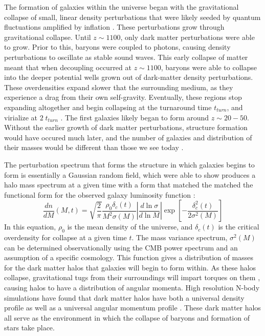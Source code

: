 The formation of galaxies within the universe began with the gravitational
collapse of small, linear density perturbations that were likely seeded by
quantum fluctuations amplified by inflation \citep{Guth1981,Linde1982}.  These
perturbations grow through gravitational collapse.  Until $z\sim1100$, only dark
matter perturbations were able to grow.  Prior to this, baryons were coupled to
photons, causing density perturbations to oscillate as stable sound waves.  This
early collapse of matter meant that when decoupling occurred at $z\sim1100$,
baryons were able to collapse into the deeper potential wells grown out of
dark-matter density perturbations.  These overdensities expand slower that the
surrounding medium, as they experience a drag from their own self-gravity.
Eventually, these regions stop expanding altogether and begin collapsing at the
turnaround time $t_{turn}$, and virialize at $2\;t_{turn}$ \citep{Peebles1980}.
The first galaxies likely began to form around $z\sim20-50$.  Without the
earlier growth of dark matter perturbations, structure formation would have
occured much later, and the number of galaxies and distribution of their masses
would be different than those we see today \citep{Davis1985}.

The perturbation spectrum that forms the structure in which galaxies begins to
form is essentially a Gaussian random field, which \citet{Press1974} were able
to show produces a halo mass spectrum at a given time with a form that matched
the matched the functional form for the observed galaxy luminosity function
\citet{Schechter1976}:
\begin{equation}
    \frac{dn}{dM}(M,t) =
    \sqrt{\frac{2}{\pi}}\frac{\rho_0\delta_c(t)}{M^2\sigma(M)} 
    \left\lvert\frac{d\ln{\sigma}}{d\ln{M}}\right\rvert
    \exp{\left[-\frac{\delta^2_c(t)}{2\sigma^2(M)}\right]}
\end{equation}
In this equation, $\rho_0$ is the mean density of the universe, and
$\delta_c(t)$ is the critical overdensity for collapse at a given time $t$.
The mass variance spectrum, $\sigma^2(M)$ can be determined observationally
using the CMB power spectrum \citep{Fixsen1996,Spergel2003,Planck2015} and an
assumption of a specific cosmology.  This function gives a distribution of
masses for the dark matter halos that galaxies will begin to form within.  As
these halos collapse, gravitational tugs from their surroundings will impart
torques on them \citep{Barnes1987}, causing halos to have a distribution of
angular momenta.  High resolution N-body simulations have found that dark
matter halos have both a universal density profile
\citep{Navarro1996,Merritt2006} as well as a universal angular momentum profile
\citep{Bullock2001}.  These dark matter halos all serve as the environment in
which the collapse of baryons and formation of stars take place.

